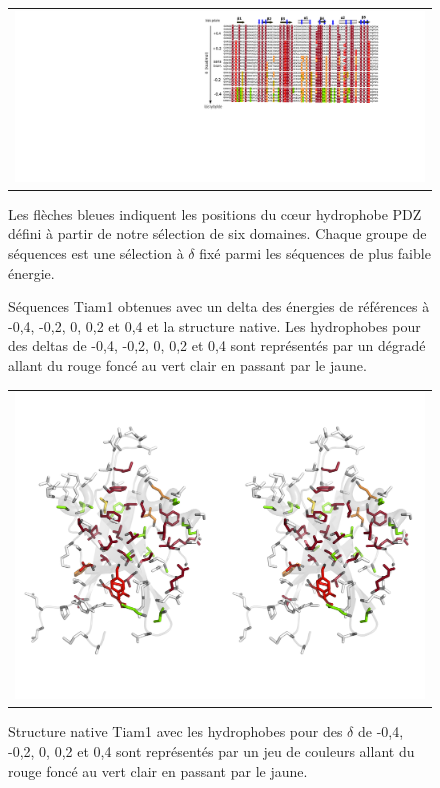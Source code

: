\begin{figure}[!htbp]
  \caption{ Séquences Tiam1 obtenues avec un delta des énergies de références à -0,4, -0,2, 0, 0,2 et 0,4 et la structure native. Les hydrophobes pour des deltas de -0,4, -0,2, 0, 0,2 et 0,4 sont représentés par un dégradé allant du rouge foncé au vert clair en passant par le jaune.}
  \centering
  \begin{tabular}{c}
    \includegraphics[width=17cm]{titration/alignTiam1.png} \\
  \end{tabular}      
  \label{titrAlignTiam1}
        {\footnotesize Les flèches bleues indiquent les positions du cœur hydrophobe PDZ défini à partir de notre sélection de six domaines. Chaque groupe de séquences est une sélection à $\delta$ fixé parmi les séquences de plus faible énergie.}
        
\end{figure}

\begin{landscape}
    \begin{figure}[!htbp]
      \centering
      \caption{ Structure native Tiam1 avec les hydrophobes pour des $\delta$ de -0,4, -0,2, 0, 0,2 et 0,4 sont représentés par un jeu de couleurs allant du rouge foncé au vert clair en passant par le jaune.}

      \begin{tabular}{c}
        \includegraphics[width=22cm]{titration/structure_Tiam1.png} \\
      \end{tabular}
      
      \label{titrStructTiam1}
    \end{figure}

\end{landscape}

